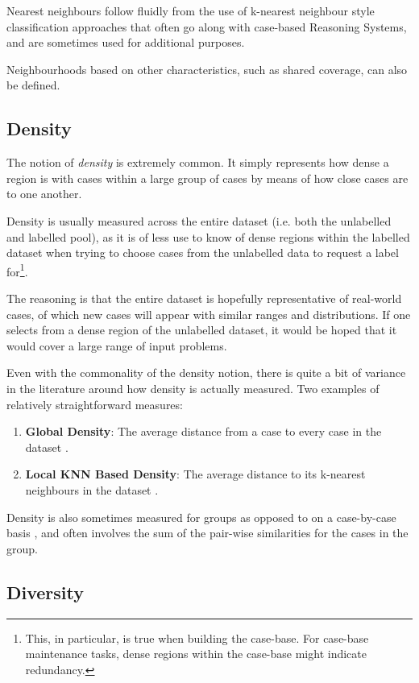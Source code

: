 \documentclass[a4paper,11pt]{report}
\begin{document}
Nearest neighbours follow fluidly from the use of k-nearest neighbour style classification approaches that often go along with case-based Reasoning Systems, and are sometimes used for additional purposes.

Neighbourhoods based on other characteristics, such as shared coverage, can also be defined.

\subsection{Density}
The notion of \emph{density} is extremely common. It simply represents how dense a region is with cases within a large group of cases by means of how close cases are to one another.

Density is usually measured across the entire dataset (i.e. both the unlabelled and labelled pool), as it is of less use to know of dense regions within the labelled dataset when trying to choose cases from the unlabelled data to request a label for\footnote{This, in particular, is true when building the case-base. For case-base maintenance tasks, dense regions within the case-base might indicate redundancy.}. 

The reasoning is that the entire dataset is hopefully representative of real-world cases, of which new cases will appear with similar ranges and distributions. If one selects from a dense region of the unlabelled dataset, it would be hoped that it would cover a large range of input problems.

\begin{samepage}
Even with the commonality of the density notion, there is quite a bit of variance in the literature around how density is actually measured. Two examples of relatively straightforward measures:
\begin{enumerate}
	\item \textbf{Global Density}: The average distance from a case to every case in the dataset \citep{Xu2007}.
	\item \textbf{Local KNN Based Density}: The average distance to its k-nearest neighbours in the dataset \citep{Zhu2008}.
\end{enumerate}
\end{samepage}

Density is also sometimes measured for groups as opposed to on a case-by-case basis \citep{Smyth1998}, and often involves the sum of the pair-wise similarities for the cases in the group.

\subsection{Diversity}
\end{document}
